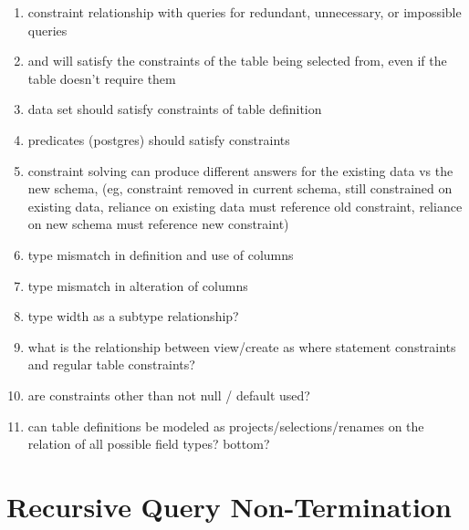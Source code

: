 \documentclass[12pt]{article}
\begin{document}
\begin{enumerate}
  \item constraint relationship with queries for redundant, unnecessary, or impossible queries
  \item {} and  will satisfy the constraints of the table being selected from, even if the table doesn't require them
  \item {} data set should satisfy constraints of table definition
  \item {} predicates (postgres) should satisfy constraints
  \item constraint solving can produce different answers for the existing data vs the new schema, (eg, constraint removed in current schema, still constrained on existing data, reliance on existing data must reference old constraint, reliance on new schema must reference new constraint)
  \item type mismatch in definition and use of columns
  \item type mismatch in alteration of columns
  \item type width as a subtype relationship?
  \item what is the relationship between view/create as where statement constraints and regular table constraints?
  \item are constraints other than not null / default used?
  \item can table definitions be modeled as projects/selections/renames on the relation of all possible field types? bottom?
\end{enumerate}

\newpage
\section{Recursive Query Non-Termination}
\end{document}
